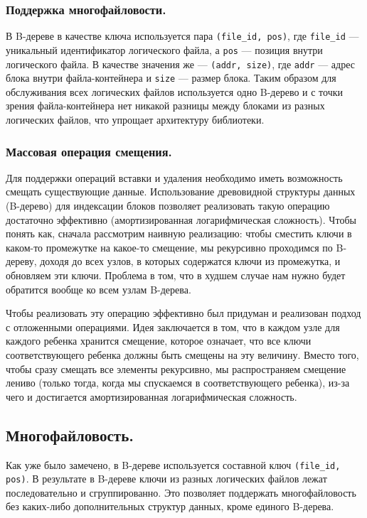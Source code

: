 \subsubsection{Поддержка многофайловости.}

В B-дереве в качестве ключа используется пара \texttt{(file\_id, pos)}, где \texttt{file\_id} --- уникальный идентификатор логического файла, а \texttt{pos} --- позиция внутри логического файла. В качестве значения же --- \texttt{(addr, size)}, где \texttt{addr} --- адрес блока внутри файла-контейнера и \texttt{size} --- размер блока. Таким образом для обслуживания всех логических файлов используется одно B-дерево и с точки зрения файла-контейнера нет никакой разницы между блоками из разных логических файлов, что упрощает архитектуру библиотеки.

\subsubsection{Массовая операция смещения.}

Для поддержки операций вставки и удаления необходимо иметь возможность смещать существующие данные. Использование древовидной структуры данных (B-дерево) для индексации блоков позволяет реализовать такую операцию достаточно эффективно (амортизированная логарифмическая сложность). Чтобы понять как, сначала рассмотрим наивную реализацию: чтобы сместить ключи в каком-то промежутке на какое-то смещение, мы рекурсивно проходимся по B-дереву, доходя до всех узлов, в которых содержатся ключи из промежутка, и обновляем эти ключи. Проблема в том, что в худшем случае нам нужно будет обратится вообще ко всем узлам B-дерева.

Чтобы реализовать эту операцию эффективно был придуман и реализован подход с отложенными операциями. Идея заключается в том, что в каждом узле для каждого ребенка хранится смещение, которое означает, что все ключи соответствующего ребенка должны быть смещены на эту величину. Вместо того, чтобы сразу смещать все элементы рекурсивно, мы распространяем смещение лениво (только тогда, когда мы спускаемся в соответствующего ребенка), из-за чего и достигается амортизированная логарифмическая сложность.

\subsection{Многофайловость.}

Как уже было замечено, в B-дереве используется составной ключ \texttt{(file\_id, pos)}. В результате в B-дереве ключи из разных логических файлов лежат последовательно и сгруппированно. Это позволяет поддержать многофайловость без каких-либо дополнительных структур данных, кроме единого B-дерева.

